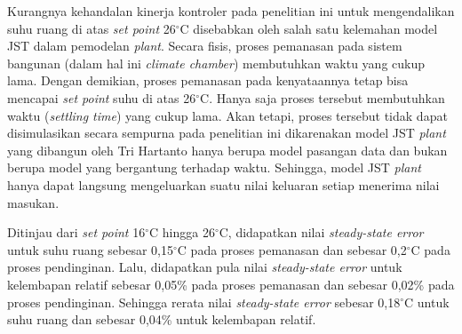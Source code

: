 Kurangnya kehandalan kinerja kontroler pada penelitian ini untuk mengendalikan suhu ruang di atas \textit{set point} 26$^\circ$C disebabkan oleh salah satu kelemahan model JST dalam pemodelan \textit{plant}. Secara fisis, proses pemanasan pada sistem bangunan (dalam hal ini \textit{climate chamber}) membutuhkan waktu yang cukup lama. Dengan demikian, proses pemanasan pada kenyataannya tetap bisa mencapai \textit{set point} suhu di atas 26$^\circ$C. Hanya saja proses tersebut membutuhkan waktu (\textit{settling time}) yang cukup lama. Akan tetapi, proses tersebut tidak dapat disimulasikan secara sempurna pada penelitian ini dikarenakan model JST \textit{plant} yang dibangun oleh Tri Hartanto\cite{skripsiTanto} hanya berupa model pasangan data dan bukan berupa model yang bergantung terhadap waktu. Sehingga, model JST \textit{plant} hanya dapat langsung mengeluarkan suatu nilai keluaran setiap menerima nilai masukan.

Ditinjau dari \textit{set point} 16$^\circ$C hingga 26$^\circ$C, didapatkan nilai \textit{steady-state error} untuk suhu ruang sebesar 0,15$^\circ$C pada proses pemanasan dan sebesar 0,2$^\circ$C pada proses pendinginan. Lalu, didapatkan pula nilai \textit{steady-state error} untuk kelembapan relatif sebesar 0,05\% pada proses pemanasan dan sebesar 0,02\% pada proses pendinginan. Sehingga rerata nilai \textit{steady-state error} sebesar 0,18$^\circ$C untuk suhu ruang dan sebesar 0,04\% untuk kelembapan relatif.